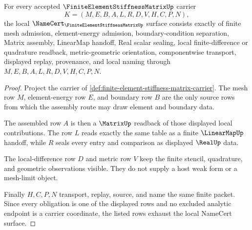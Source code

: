 \begin{theorem}
\label{thm:finite-element-stiffness-matrix-namecert-obligations}
For every accepted $\FiniteElementStiffnessMatrixUp$ carrier
$$
K=(M,E,B,A,L,R,D,V,H,C,P,N),
$$
the local $\NameCert_{\FiniteElementStiffnessMatrixUp}$ surface consists exactly of finite mesh admission, element-energy admission, boundary-condition separation, Matrix assembly, LinearMap handoff, Real scalar sealing, local finite-difference or quadrature readback, metric-geometric orientation, componentwise transport, displayed replay, provenance, and local naming through $M,E,B,A,L,R,D,V,H,C,P,N$.
\end{theorem}
\begin{proof}
Project the carrier of \autoref{def:finite-element-stiffness-matrix-carrier}. The mesh row $M$, element-energy row $E$, and boundary row $B$ are the only source rows from which the assembly route may draw element and boundary data.

The assembled row $A$ is then a $\MatrixUp$ readback of those displayed local contributions. The row $L$ reads exactly the same table as a finite $\LinearMapUp$ handoff, while $R$ seals every entry and comparison as displayed $\RealUp$ data.

The local-difference row $D$ and metric row $V$ keep the finite stencil, quadrature, and geometric observations visible. They do not supply a host weak form or a mesh-limit object.

Finally $H,C,P,N$ transport, replay, source, and name the same finite packet. Since every obligation is one of the displayed rows and no excluded analytic endpoint is a carrier coordinate, the listed rows exhaust the local NameCert surface.
\end{proof}

